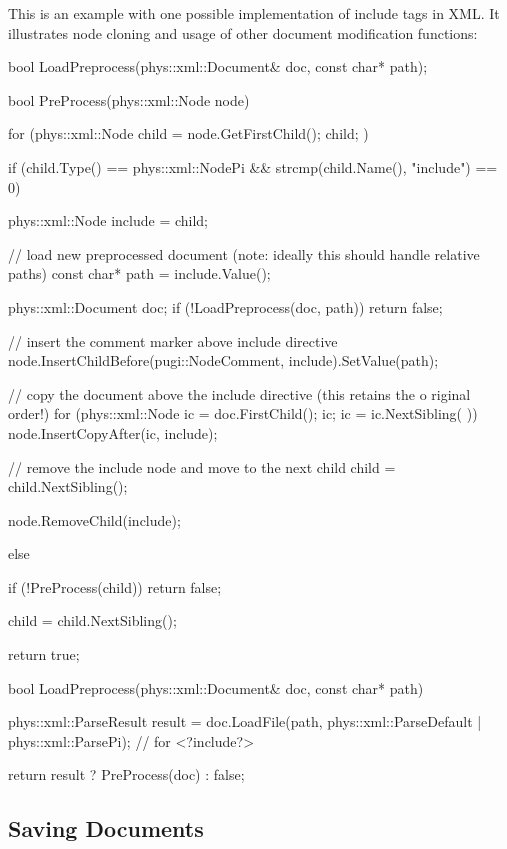 This is an example with one possible implementation of include tags in XML. It illustrates node cloning and usage of other document modification functions: 
\begin{DoxyCode}
 bool LoadPreprocess(phys::xml::Document& doc, const char* path);

 bool PreProcess(phys::xml::Node node)
 {
     for (phys::xml::Node child = node.GetFirstChild(); child; )
     {
         if (child.Type() == phys::xml::NodePi && strcmp(child.Name(), "include")
       == 0)
         {
             phys::xml::Node include = child;

             // load new preprocessed document (note: ideally this should handle 
      relative paths)
             const char* path = include.Value();

             phys::xml::Document doc;
             if (!LoadPreprocess(doc, path)) return false;

             // insert the comment marker above include directive
             node.InsertChildBefore(pugi::NodeComment, include).SetValue(path);

             // copy the document above the include directive (this retains the o
      riginal order!)
             for (phys::xml::Node ic = doc.FirstChild(); ic; ic = ic.NextSibling(
      ))
             {
                 node.InsertCopyAfter(ic, include);
             }

             // remove the include node and move to the next child
             child = child.NextSibling();

             node.RemoveChild(include);
         }
         else
         {
             if (!PreProcess(child)) return false;

             child = child.NextSibling();
         }
     }

     return true;
 }

 bool LoadPreprocess(phys::xml::Document& doc, const char* path)
 {
     phys::xml::ParseResult result = doc.LoadFile(path, phys::xml::ParseDefault |
       phys::xml::ParsePi); // for <?include?>

     return result ? PreProcess(doc) : false;
 }
\end{DoxyCode}
 \hypertarget{XMLManual_XMLSaving}{}\subsection{Saving Documents}\label{XMLManual_XMLSaving}

